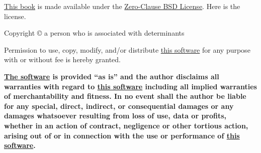 \vfill

\noindent%
\href{https://github.com/septsea/det}{This book}
is made available under the
\href{https://opensource.org/license/0bsd}{Zero-Clause BSD License}.
Here is the license.

\vspace{1.5ex}

Copyright © \thedate{}
\pdfmarkupcomment[opacity=0]%
{\protect\theauthor{}}%
{a person who is associated with determinants}

Permission to use, copy, modify, and/or distribute
\href{https://github.com/septsea/det}{this software}
for any purpose with or without fee is hereby granted.

\textbf{%
    \href{https://github.com/septsea/det}{The software}
    is provided ``as is'' and the author disclaims all warranties with regard to
    \href{https://github.com/septsea/det}{this software}
    including all implied warranties of merchantability and fitness. In no event shall the author be liable for any special, direct, indirect, or consequential damages or any damages whatsoever resulting from loss of use, data or profits, whether in an action of contract, negligence or other tortious action, arising out of or in connection with the use or performance of
    \href{https://github.com/septsea/det}{this software}.%
}

\endgroup

\clearpage
